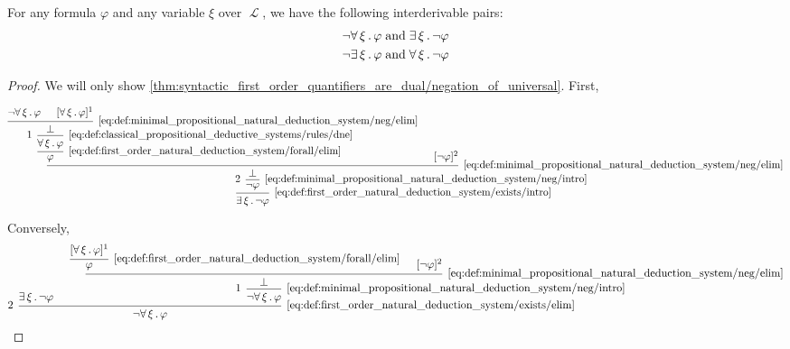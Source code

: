 \begin{proposition}\label{thm:syntactic_first_order_quantifiers_are_dual}
  For any formula \( \varphi \) and any variable \( \xi \) over \( \mscrL \), we have the following interderivable pairs:
  \begin{align}
    \neg \qforall \xi \varphi &\T{and} \qexists \xi \neg \varphi \label{thm:syntactic_first_order_quantifiers_are_dual/negation_of_universal} \\
    \neg \qexists \xi \varphi &\T{and} \qforall \xi \neg \varphi \label{thm:syntactic_first_order_quantifiers_are_dual/negation_of_existential}
  \end{align}
\end{proposition}
\begin{proof}
  We will only show \eqref{thm:syntactic_first_order_quantifiers_are_dual/negation_of_universal}. First,

  \begin{equation*}
    \begin{prooftree}
      \hypo{ \neg \qforall \xi \varphi }
      \hypo{ [\qforall \xi \varphi]^1 }
      \infer2[\eqref{eq:def:minimal_propositional_natural_deduction_system/neg/elim}]{ \bot }
      \infer[left label=\( 1 \)]1[\eqref{eq:def:classical_propositional_deductive_systems/rules/dne}]{ \qforall \xi \varphi }
      \infer1[\eqref{eq:def:first_order_natural_deduction_system/forall/elim}]{ \varphi }

      \hypo{ [\neg \varphi]^2 }
      \infer2[\eqref{eq:def:minimal_propositional_natural_deduction_system/neg/elim}]{ \bot }

      \infer[left label=\( 2 \)]1[\eqref{eq:def:minimal_propositional_natural_deduction_system/neg/intro}]{ \neg \varphi }
      \infer1[\eqref{eq:def:first_order_natural_deduction_system/exists/intro}]{ \qexists \xi \neg \varphi }
    \end{prooftree}
  \end{equation*}

  Conversely,
  \begin{equation*}
    \begin{prooftree}
      \hypo{ \qexists \xi \neg \varphi }

      \hypo{ [\qforall \xi \varphi]^1 }
      \infer1[\eqref{eq:def:first_order_natural_deduction_system/forall/elim}]{ \varphi }

      \hypo{ [\neg \varphi]^2 }
      \infer2[\eqref{eq:def:minimal_propositional_natural_deduction_system/neg/elim}]{ \bot }
      \infer[left label=\( 1 \)]1[\eqref{eq:def:minimal_propositional_natural_deduction_system/neg/intro}]{ \neg \qforall \xi \varphi }

      \infer[left label=\( 2 \)]2[\eqref{eq:def:first_order_natural_deduction_system/exists/elim}]{ \neg \qforall \xi \varphi }
    \end{prooftree}
  \end{equation*}
\end{proof}

